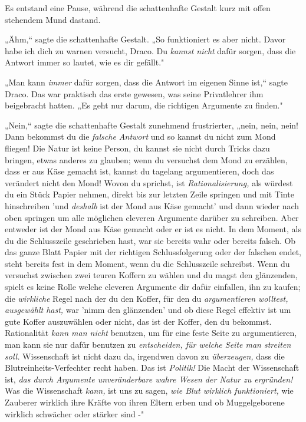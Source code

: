 {Es entstand eine Pause, während die schattenhafte Gestalt kurz mit offen stehendem Mund dastand.

„Ähm,“ sagte die schattenhafte Gestalt. „So funktioniert es aber nicht. Davor habe ich dich zu warnen versucht, Draco. Du \emph{kannst nicht} dafür sorgen, dass die Antwort immer so lautet, wie es dir gefällt."

„Man kann \emph{immer} dafür sorgen, dass die Antwort im eigenen Sinne ist,“ sagte Draco. Das war praktisch das erste gewesen, was seine Privatlehrer ihm beigebracht hatten. „Es geht nur darum, die richtigen Argumente zu finden."

„Nein,“ sagte die schattenhafte Gestalt zunehmend frustrierter, „nein, nein, nein! Dann bekommst du die \emph{falsche Antwort} und so kannst du nicht zum Mond fliegen! Die Natur ist keine Person, du kannst sie nicht durch Tricks dazu bringen, etwas anderes zu glauben; wenn du versuchst dem Mond zu erzählen, dass er aus Käse gemacht ist, kannst du tagelang argumentieren, doch das verändert nicht den Mond! Wovon du sprichst, ist \emph{Rationalisierung,} als würdest du ein Stück Papier nehmen, direkt bis zur letzten Zeile springen und mit Tinte hinschreiben 'und \emph{deshalb} ist der Mond aus Käse gemacht' und dann wieder nach oben springen um alle möglichen cleveren Argumente darüber zu schreiben. Aber entweder ist der Mond aus Käse gemacht oder er ist es nicht. In dem Moment, als du die Schlusszeile geschrieben hast, war sie bereits wahr oder bereits falsch. Ob das ganze Blatt Papier mit der richtigen Schlussfolgerung oder der falschen endet, steht bereits fest in dem Moment, wenn du die Schlusszeile schreibst. Wenn du versuchst zwischen zwei teuren Koffern zu wählen und du magst den glänzenden, spielt es keine Rolle welche cleveren Argumente dir dafür einfallen, ihn zu kaufen; die \emph{wirkliche} Regel nach der du den Koffer, für den du \emph{argumentieren wolltest, ausgewählt hast,} war 'nimm den glänzenden' und ob diese Regel effektiv ist um gute Koffer auszuwählen oder nicht, das ist der Koffer, den du bekommst. Rationalität \emph{kann man nicht} benutzen, um für eine feste Seite zu argumentieren, man kann sie nur dafür benutzen zu \emph{entscheiden, für welche Seite man streiten soll.} Wissenschaft ist nicht dazu da, irgendwen davon zu \emph{überzeugen,} dass die Blutreinheits-Verfechter recht haben. Das ist \emph{Politik!} Die Macht der Wissenschaft ist, \emph{das durch Argumente unveränderbare wahre Wesen der Natur zu ergründen!} Was die Wissenschaft \emph{kann,} ist uns zu sagen, \emph{wie Blut wirklich funktioniert,} wie Zauberer wirklich ihre Kräfte von ihren Eltern erben und ob Muggelgeborene wirklich schwächer oder stärker sind -"

}
